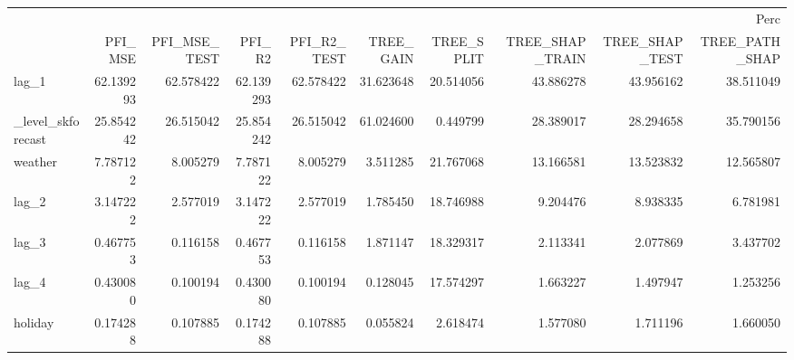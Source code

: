 \begin{tabular}{lrrrrrrrrr}
\toprule
 & \multicolumn{9}{r}{Perc} \\
 & PFI_MSE & PFI_MSE_TEST & PFI_R2 & PFI_R2_TEST & TREE_GAIN & TREE_SPLIT & TREE_SHAP_TRAIN & TREE_SHAP_TEST & TREE_PATH_SHAP \\
\midrule
lag_1 & 62.139293 & 62.578422 & 62.139293 & 62.578422 & 31.623648 & 20.514056 & 43.886278 & 43.956162 & 38.511049 \\
_level_skforecast & 25.854242 & 26.515042 & 25.854242 & 26.515042 & 61.024600 & 0.449799 & 28.389017 & 28.294658 & 35.790156 \\
weather & 7.787122 & 8.005279 & 7.787122 & 8.005279 & 3.511285 & 21.767068 & 13.166581 & 13.523832 & 12.565807 \\
lag_2 & 3.147222 & 2.577019 & 3.147222 & 2.577019 & 1.785450 & 18.746988 & 9.204476 & 8.938335 & 6.781981 \\
lag_3 & 0.467753 & 0.116158 & 0.467753 & 0.116158 & 1.871147 & 18.329317 & 2.113341 & 2.077869 & 3.437702 \\
lag_4 & 0.430080 & 0.100194 & 0.430080 & 0.100194 & 0.128045 & 17.574297 & 1.663227 & 1.497947 & 1.253256 \\
holiday & 0.174288 & 0.107885 & 0.174288 & 0.107885 & 0.055824 & 2.618474 & 1.577080 & 1.711196 & 1.660050 \\
\bottomrule
\end{tabular}

